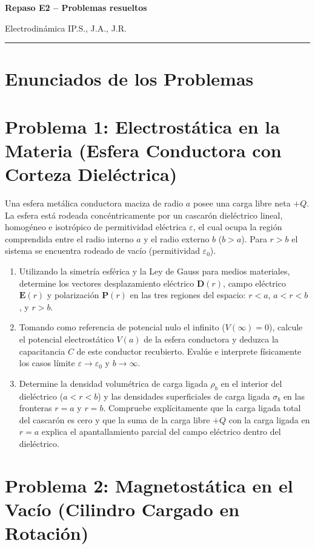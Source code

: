 \documentclass[11pt]{article}
\newcommand{\encabezado}[3]{%
  {\Large\bfseries #1\par}
  \vspace{2pt}
  {\normalsize #2\hfill #3\par}
  \vspace{6pt}\hrule\vspace{8pt}}
\begin{document}
\encabezado{Repaso E2 -- Problemas resueltos}
{Electrodinámica I}{P.S., J.A., J.R.}

\section*{Enunciados de los Problemas}


\section*{Problema 1: Electrostática en la Materia (Esfera Conductora con Corteza Dieléctrica)}

Una esfera metálica conductora maciza de radio $a$ posee una carga libre neta $+Q$. La esfera está rodeada concéntricamente por un cascarón dieléctrico lineal, homogéneo e isotrópico de permitividad eléctrica $\varepsilon$, el cual ocupa la región comprendida entre el radio interno $a$ y el radio externo $b$ ($b > a$). Para $r > b$ el sistema se encuentra rodeado de vacío (permitividad $\varepsilon_0$).

\begin{enumerate}
    \item[a)] Utilizando la simetría esférica y la Ley de Gauss para medios materiales, determine los vectores desplazamiento eléctrico $\mathbf{D}(r)$, campo eléctrico $\mathbf{E}(r)$ y polarización $\mathbf{P}(r)$ en las tres regiones del espacio: $r < a$, $a < r < b$, y $r > b$.
    \item[b)] Tomando como referencia de potencial nulo el infinito ($V(\infty) = 0$), calcule el potencial electrostático $V(a)$ de la esfera conductora y deduzca la capacitancia $C$ de este conductor recubierto. Evalúe e interprete físicamente los casos límite $\varepsilon \to \varepsilon_0$ y $b \to \infty$.
    \item[c)] Determine la densidad volumétrica de carga ligada $\rho_b$ en el interior del dieléctrico ($a < r < b$) y las densidades superficiales de carga ligada $\sigma_b$ en las fronteras $r = a$ y $r = b$. Compruebe explícitamente que la carga ligada total del cascarón es cero y que la suma de la carga libre $+Q$ con la carga ligada en $r = a$ explica el apantallamiento parcial del campo eléctrico dentro del dieléctrico.
\end{enumerate}

\vspace{0.3cm}

\section*{Problema 2: Magnetostática en el Vacío (Cilindro Cargado en Rotación)}
\end{document}
